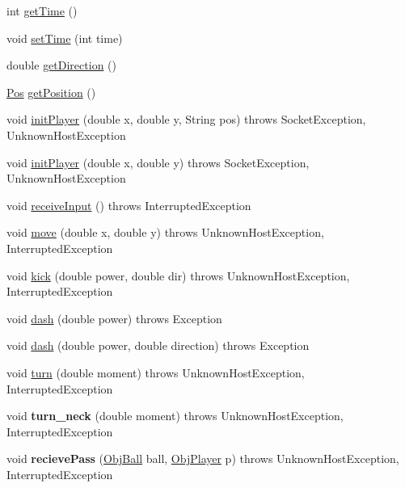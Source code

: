 \begin{DoxyCompactItemize}
\item 
int \hyperlink{classPlayer_a0405759b5c1c513a387b09739c271743}{getTime} ()
\item 
void \hyperlink{classPlayer_afca6d7498e56e2e82ddea7e89395a146}{setTime} (int time)
\item 
double \hyperlink{classPlayer_a2ff5bd2585d3d7388dce85576002c668}{getDirection} ()
\item 
\hyperlink{classPos}{Pos} \hyperlink{classPlayer_ae1947ff6dfb298de4699f9f79ea221cf}{getPosition} ()
\item 
void \hyperlink{classPlayer_aa826be330bb3dc6bf7bb8ac04250fe50}{initPlayer} (double x, double y, String pos)  throws SocketException, UnknownHostException 
\item 
void \hyperlink{classPlayer_a29c711f9c1d5bb762611f8e0f8c2fd47}{initPlayer} (double x, double y)  throws SocketException, UnknownHostException 
\item 
void \hyperlink{classPlayer_a65f067086737b201d4183a1bb258e7ac}{receiveInput} ()  throws InterruptedException  
\item 
void \hyperlink{classPlayer_a787e2731a4ca14dcde043bad13633b89}{move} (double x, double y)  throws UnknownHostException, InterruptedException 
\item 
void \hyperlink{classPlayer_a515b5502a44f38e8fe8fe65f6601ee8f}{kick} (double power, double dir)  throws UnknownHostException, InterruptedException 
\item 
void \hyperlink{classPlayer_ab1823f2a23684dab547f9012c8e26b70}{dash} (double power)  throws Exception 
\item 
void \hyperlink{classPlayer_a16dea4b97be4347baf5dd9d973d651cf}{dash} (double power, double direction)  throws Exception 
\item 
void \hyperlink{classPlayer_aa1dd6cce198db61386b701b8520b512a}{turn} (double moment)  throws UnknownHostException, InterruptedException 
\item 
\hypertarget{classPlayer_a3a1aac767e1da565b42b1fb027e2d848}{
void {\bfseries turn\_\-neck} (double moment)  throws UnknownHostException, InterruptedException }
\label{classPlayer_a3a1aac767e1da565b42b1fb027e2d848}

\item 
\hypertarget{classPlayer_a39c66a7fce40dacf016942aa0f40e831}{
void {\bfseries recievePass} (\hyperlink{classObjBall}{ObjBall} ball, \hyperlink{classObjPlayer}{ObjPlayer} p)  throws UnknownHostException, InterruptedException }
\label{classPlayer_a39c66a7fce40dacf016942aa0f40e831}


\end{DoxyCompactItemize}
